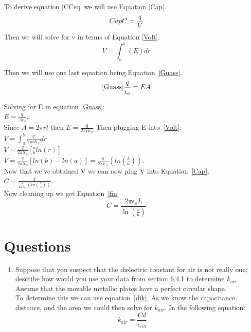 \documentclass[10pt]{article}
\begin{document}
To derive equation \ref*{CCeq} we will use Equation \ref*{Cap}.\\
\begin{equation}\label*{Cap}
  C = \frac{q}{V}
\end{equation}
Then we will solve for v in terms of Equation \ref*{Volt}.\\
\begin{equation}\label{Volt}
  V = \int_{a}^{b}(E)dr
\end{equation}

Then we will use one last equation being Equation~\ref*{Guass}.\\
\begin{equation}\ref*{Guass}
  \frac{q}{\epsilon_{o}} = EA
\end{equation}

Solving for E in equation \ref*{Guass}:\\
$E = \frac{q}{A\epsilon_{o}}$.\\
Since $A = 2\pi rl$ then $E = \frac{q}{2\pi rl\epsilon_{o}}$
Then plugging E into~\ref*{Volt}:\\
$V = \int_{a}^{b}\frac{q}{2\pi rl\epsilon_{o}} dr$\\
$V = \frac{q}{2\pi l\epsilon_{o}} [_{b}^{a}ln(r)]$\\
$V = \frac{q}{2\pi l\epsilon_{o}} [ln(b) - ln(a)] = \frac{q}{2\pi l\epsilon_{o}} (ln(\frac{b}{a}))$.\\
Now that we've obtained V we can now plug V into Equation~\ref*{Cap}.\\
$C = \frac{q}{\frac{q}{2\pi l\epsilon_{o}} (ln(\frac{b}{a}))}$.\\
Now cleaning up we get Equation~\ref*{fin}\\
\begin{equation}\label{fin}
  C = \frac{2\pi\epsilon_{o}L}{\ln(\frac{b}{a})}
\end{equation}

\section{Questions}
\begin{enumerate}
  \item Suppose that you suspect that the dielectric constant for air is not really one; describe how
  would you use your data from section 6.4.1 to determine $k_{air}$. Assume that the movable
  metallic plates have a perfect circular shape.\\

  To determine this we can use equation~\ref*{dik}. As we know the capacitance, distance, and the area
  we could then solve for $k_{air}$. In the following equation:
  \begin{equation}
    k_{air} = \frac{Cd}{\epsilon_{oA}}
  \end{equation}
\end{enumerate}
\end{document}
